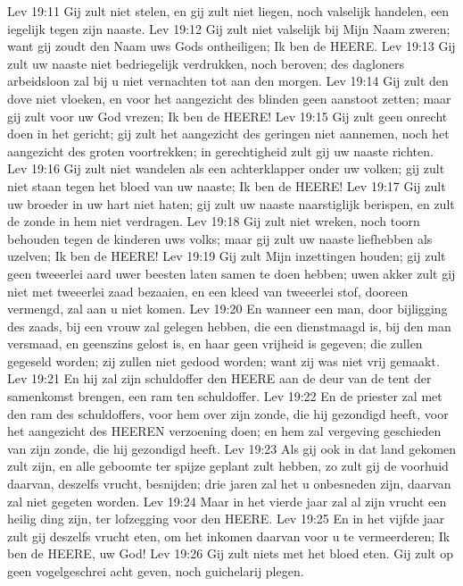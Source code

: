 Lev 19:11  Gij zult niet stelen, en gij zult niet liegen, noch valselijk handelen, een iegelijk tegen zijn naaste.
Lev 19:12  Gij zult niet valselijk bij Mijn Naam zweren; want gij zoudt den Naam uws Gods ontheiligen; Ik ben de HEERE.
Lev 19:13  Gij zult uw naaste niet bedriegelijk verdrukken, noch beroven; des dagloners arbeidsloon zal bij u niet vernachten tot aan den morgen.
Lev 19:14  Gij zult den dove niet vloeken, en voor het aangezicht des blinden geen aanstoot zetten; maar gij zult voor uw God vrezen; Ik ben de HEERE!
Lev 19:15  Gij zult geen onrecht doen in het gericht; gij zult het aangezicht des geringen niet aannemen, noch het aangezicht des groten voortrekken; in gerechtigheid zult gij uw naaste richten.
Lev 19:16  Gij zult niet wandelen als een achterklapper onder uw volken; gij zult niet staan tegen het bloed van uw naaste; Ik ben de HEERE!
Lev 19:17  Gij zult uw broeder in uw hart niet haten; gij zult uw naaste naarstiglijk berispen, en zult de zonde in hem niet verdragen.
Lev 19:18  Gij zult niet wreken, noch toorn behouden tegen de kinderen uws volks; maar gij zult uw naaste liefhebben als uzelven; Ik ben de HEERE!
Lev 19:19  Gij zult Mijn inzettingen houden; gij zult geen tweeerlei aard uwer beesten laten samen te doen hebben; uwen akker zult gij niet met tweeerlei zaad bezaaien, en een kleed van tweeerlei stof, dooreen vermengd, zal aan u niet komen.
Lev 19:20  En wanneer een man, door bijligging des zaads, bij een vrouw zal gelegen hebben, die een dienstmaagd is, bij den man versmaad, en geenszins gelost is, en haar geen vrijheid is gegeven; die zullen gegeseld worden; zij zullen niet gedood worden; want zij was niet vrij gemaakt.
Lev 19:21  En hij zal zijn schuldoffer den HEERE aan de deur van de tent der samenkomst brengen, een ram ten schuldoffer.
Lev 19:22  En de priester zal met den ram des schuldoffers, voor hem over zijn zonde, die hij gezondigd heeft, voor het aangezicht des HEEREN verzoening doen; en hem zal vergeving geschieden van zijn zonde, die hij gezondigd heeft.
Lev 19:23  Als gij ook in dat land gekomen zult zijn, en alle geboomte ter spijze geplant zult hebben, zo zult gij de voorhuid daarvan, deszelfs vrucht, besnijden; drie jaren zal het u onbesneden zijn, daarvan zal niet gegeten worden.
Lev 19:24  Maar in het vierde jaar zal al zijn vrucht een heilig ding zijn, ter lofzegging voor den HEERE.
Lev 19:25  En in het vijfde jaar zult gij deszelfs vrucht eten, om het inkomen daarvan voor u te vermeerderen; Ik ben de HEERE, uw God!
Lev 19:26  Gij zult niets met het bloed eten. Gij zult op geen vogelgeschrei acht geven, noch guichelarij plegen.

